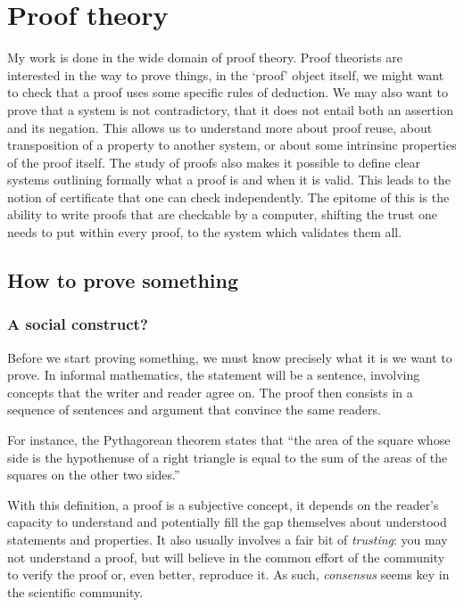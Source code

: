 \chapter{Proof theory}

My work is done in the wide domain of proof theory. Proof theorists are
interested in the way to prove things, in the `proof' object itself, \eg we
might want to check that a proof uses some specific rules of deduction.
We may also want to prove that a system is not contradictory, \ie that it does
not entail both an assertion and its negation.
This allows us to understand more about proof reuse, about transposition of a
property to another system, or about some intrinsinc properties of the proof
itself. The study of proofs also makes it possible to define clear systems
outlining formally what a proof is and when it is valid. This leads to the
notion of certificate that one can check independently. The epitome of this is
the ability to write proofs that are checkable by a computer, shifting the trust
one needs to put within every proof, to the system which validates them all.

\section{How to prove something}

\subsection{A social construct?}

Before we start proving something, we must know precisely what it is we want to
prove. In informal mathematics, the statement will be a sentence, involving
concepts that the writer and reader agree on. The proof then consists in a
sequence of sentences and argument that convince the same readers.

For instance, the Pythagorean theorem states that
``the area of the square whose side is the hypothenuse of a right triangle is
equal to the sum of the areas of the squares on the other two sides.''

With this definition, a proof is a subjective concept, it depends on the
reader's capacity to understand and potentially fill the gap themselves about
understood statements and properties. It also usually involves a fair bit of
\emph{trusting}: you may not understand a proof, but will believe in
the common effort of the community to verify the proof or, even better,
reproduce it.
As such, \emph{consensus} seems key in the scientific community.

